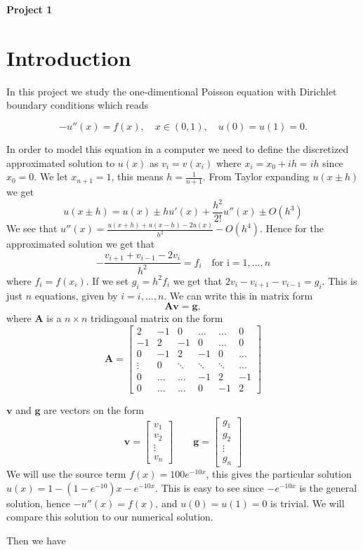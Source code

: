 \documentclass[10pt]{article}
\begin{document}
\begin{center}
  \huge \textbf{Project 1}
\end{center}
\section{Introduction}
In this project we study the one-dimentional Poisson equation 
with Dirichlet boundary conditions which reads 

\begin{equation*}
 -u''(x)=f(x),\quad x\in (0,1),\quad u(0)=u(1)=0.
\end{equation*}

In order to model this equation in a computer we need to define the 
discretized approximated solution to $ u(x) $ as $v_i=v(x_i) $ where
 $x_i=x_0+ih=ih$ since $x_0=0$. We let $x_{n+1}=1$, this means $h=\frac{1}{n+1}$.
 From Taylor expanding $u(x\pm h)$ we get 
 $$u(x\pm h)=u(x)\pm hu'(x)+\frac{h^2}{2!}u''(x)\pm O(h^3)$$
We see that $u''(x)=\frac{u(x+h)+u(x-h)-2u(x)}{h^2}-O(h^4)$. Hence for the approximated solution
 we get that $$-\frac{v_{i+1}+v_{i-1}-2v_i}{h^2}=f_i\quad \text{for i}=1,...,n$$ where $f_i=f(x_i)$. 
 If we set $g_i=h^2f_i$ we get that $2v_i-v_{i+1}-v_{i-1}=g_i$. 
 This is just $n$ equations, given by $i=i,...,n$. We can write this in matrix form 
 $$\mathbf{A}\mathbf{v}=\mathbf{g}, $$ where $\mathbf{A}$ is a $n\times n$ 
 tridiagonal matrix on the form $$\mathbf{A}=\begin{bmatrix}
   2 & -1 & 0 & \dots & ... & 0 \\
   -1 & 2 & -1 & 0 & ... & 0 \\
   0  & -1 & 2 & -1 & 0 & ... \\
   \vdots & 0 & \ddots & \ddots & \ddots & ...\\
   0 & ... & ... & -1 & 2 & -1\\
   0 & ... & ... & 0 & -1 & 2 
 \end{bmatrix}$$

 $\mathbf{v}$ and $\mathbf{g}$ are vectors on the form 
 $$\mathbf{v}=\begin{bmatrix}
   v_1\\v_2\\\vdots\\v_n
 \end{bmatrix}
 \qquad
 \mathbf{g}=\begin{bmatrix}
   g_1\\g_2\\\vdots\\g_n
 \end{bmatrix}
 $$
We will use the source term $f(x)=100e^{-10x}$, this gives the particular solution 
$u(x)=1-(1-e^{-10})x-e^{-10x}$. This is easy to see since $-e^{-10x}$ is the general solution,
 hence $-u''(x)=f(x)$, and $u(0)=u(1)=0$ is trivial. We will compare this solution to our numerical solution.


Then we have
\end{document}
